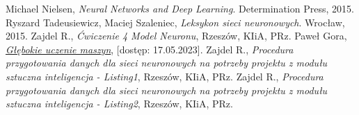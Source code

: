 \documentclass[a4paper]{article}
\begin{document}
\newpage
\begin{thebibliography}{9}
    Michael Nielsen,
    \emph{Neural Networks and Deep Learning}.
    Determination Press,
    2015.
    Ryszard Tadeusiewicz, Maciej Szaleniec,
    \emph{Leksykon sieci neuronowych}.
    Wrocław,
    2015.
    Zajdel R.,
    \emph{Ćwiczenie 4 Model Neuronu},
    Rzeszów,
    KIiA, PRz.
    Paweł Gora,
    \href{https://www.deltami.edu.pl/temat/informatyka/sztuczna_inteligencja/2017/12/28/Glebokie_uczenie_maszyn/}{\emph{Głębokie uczenie maszyn}},
    [dostęp: 17.05.2023].
    Zajdel R.,
    \emph{Procedura przygotowania danych dla sieci neuronowych na potrzeby projektu z modułu sztuczna inteligencja - Listing1},
    Rzeszów,
    KIiA, PRz.
    Zajdel R.,
    \emph{Procedura przygotowania danych dla sieci neuronowych na potrzeby projektu z modułu sztuczna inteligencja - Listing2},
    Rzeszów,
    KIiA, PRz.
\end{thebibliography}
\end{document}
